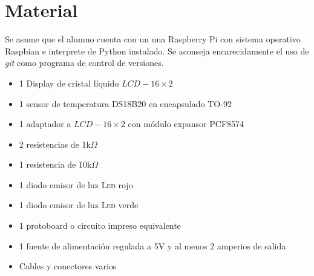 %
%



\section{Material}%
\label{sec:material}
Se asume que el alumno cuenta con un una Raspberry Pi con sistema operativo Raspbian e interprete de Python instalado. Se aconseja encarecidamente el uso de \textit{git} como programa de control de versiones.

\begin{itemize}[noitemsep]
	\item 1 Display de cristal líquido $LCD-16\times2$
	\item 1 sensor de temperatura DS18B20 en encapsulado TO-92\footnotemark{}
	\item 1 adaptador \IIC{} a $LCD-16\times2$ con módulo expansor PCF8574
	\item 2 resistencias de 1k$\Omega$
	\item 1 resistencia de 10k$\Omega$
	\item 1 diodo emisor de luz \textsc{Led} rojo
	\item 1 diodo emisor de luz \textsc{Led} verde
	\item 1 protoboard o circuito impreso equivalente
	\item 1 fuente de alimentación regulada a 5V y al menos 2 amperios de salida
	\item Cables y conectores varios
\end{itemize}

